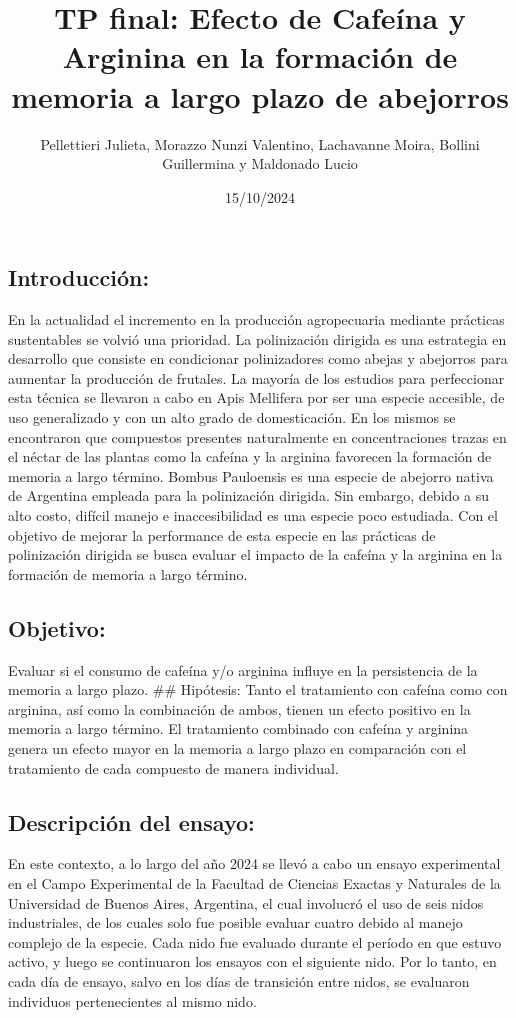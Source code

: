 \documentclass[
  11pt,
]{article}
\title{TP final: Efecto de Cafeína y Arginina en la formación de memoria
a largo plazo de abejorros}
\author{Pellettieri Julieta, Morazzo Nunzi Valentino, Lachavanne Moira,
Bollini Guillermina y Maldonado Lucio}
\date{15/10/2024}
\begin{document}
\maketitle

\subsection{Introducción:}\label{introducciuxf3n}

En la actualidad el incremento en la producción agropecuaria mediante
prácticas sustentables se volvió una prioridad. La polinización dirigida
es una estrategia en desarrollo que consiste en condicionar
polinizadores como abejas y abejorros para aumentar la producción de
frutales. La mayoría de los estudios para perfeccionar esta técnica se
llevaron a cabo en Apis Mellifera por ser una especie accesible, de uso
generalizado y con un alto grado de domesticación. En los mismos se
encontraron que compuestos presentes naturalmente en concentraciones
trazas en el néctar de las plantas como la cafeína y la arginina
favorecen la formación de memoria a largo término. Bombus Pauloensis es
una especie de abejorro nativa de Argentina empleada para la
polinización dirigida. Sin embargo, debido a su alto costo, difícil
manejo e inaccesibilidad es una especie poco estudiada. Con el objetivo
de mejorar la performance de esta especie en las prácticas de
polinización dirigida se busca evaluar el impacto de la cafeína y la
arginina en la formación de memoria a largo término.

\subsection{Objetivo:}\label{objetivo}

Evaluar si el consumo de cafeína y/o arginina influye en la persistencia
de la memoria a largo plazo. \#\# Hipótesis: Tanto el tratamiento con
cafeína como con arginina, así como la combinación de ambos, tienen un
efecto positivo en la memoria a largo término. El tratamiento combinado
con cafeína y arginina genera un efecto mayor en la memoria a largo
plazo en comparación con el tratamiento de cada compuesto de manera
individual.

\subsection{Descripción del ensayo:}\label{descripciuxf3n-del-ensayo}

En este contexto, a lo largo del año 2024 se llevó a cabo un ensayo
experimental en el Campo Experimental de la Facultad de Ciencias Exactas
y Naturales de la Universidad de Buenos Aires, Argentina, el cual
involucró el uso de seis nidos industriales, de los cuales solo fue
posible evaluar cuatro debido al manejo complejo de la especie. Cada
nido fue evaluado durante el período en que estuvo activo, y luego se
continuaron los ensayos con el siguiente nido. Por lo tanto, en cada día
de ensayo, salvo en los días de transición entre nidos, se evaluaron
individuos pertenecientes al mismo nido.
\end{document}
